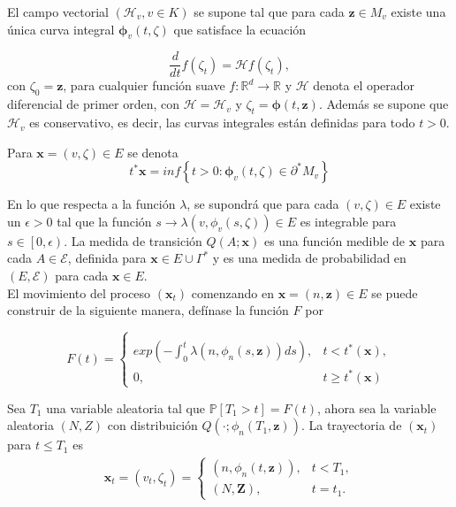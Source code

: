 \documentclass{article}
\newcommand{\rea}{\mathbb{R}}
\newcommand{\prob}{\mathbb{P}}
\numberwithin{equation}{section}
\begin{document}
El campo vectorial $\left(\mathcal{H}_{v},v\in K\right)$ se supone tal que para cada $\mathbf{z}\in M_{v}$ existe una \'unica curva integral $\mathbf{\phi}_{v}\left(t,\zeta\right)$ que satisface la ecuaci\'on

\begin{equation}
\frac{d}{dt}f\left(\zeta_{t}\right)=\mathcal{H}f\left(\zeta_{t}\right),
\end{equation}
con $\zeta_{0}=\mathbf{z}$, para cualquier funci\'on suave $f:\rea^{d}\rightarrow\rea$ y $\mathcal{H}$ denota el operador diferencial de primer orden, con $\mathcal{H}=\mathcal{H}_{v}$ y $\zeta_{t}=\mathbf{\phi}\left(t,\mathbf{z}\right)$. Adem\'as se supone que $\mathcal{H}_{v}$ es conservativo, es decir, las curvas integrales est\'an definidas para todo $t>0$.

Para $\mathbf{x}=\left(v,\zeta\right)\in E$ se denota \[t^{*}\mathbf{x}=inf\left\{t>0:\mathbf{\phi}_{v}\left(t,\zeta\right)\in\partial^{*}M_{v}\right\}\]

En lo que respecta a la funci\'on $\lambda$, se supondr\'a que para cada $\left(v,\zeta\right)\in E$ existe un $\epsilon>0$ tal que la funci\'on $s\rightarrow\lambda\left(v,\phi_{v}\left(s,\zeta\right)\right)\in E$ es integrable para $s\in\left[0,\epsilon\right)$. La medida de transici\'on $Q\left(A;\mathbf{x}\right)$ es una funci\'on medible de $\mathbf{x}$ para cada $A\in\mathcal{E}$, definida para $\mathbf{x}\in E\cup\Gamma^{*}$ y es una medida de probabilidad en $\left(E,\mathcal{E}\right)$ para cada $\mathbf{x}\in E$.\\

El movimiento del proceso $\left(\mathbf{x}_{t}\right)$ comenzando en $\mathbf{x}=\left(n,\mathbf{z}\right)\in E$ se puede construir de la siguiente manera, def\'inase la funci\'on $F$ por

\begin{equation}
F\left(t\right)=\left\{\begin{array}{ll}\\
exp\left(-\int_{0}^{t}\lambda\left(n,\phi_{n}\left(s,\mathbf{z}\right)\right)ds\right), & t<t^{*}\left(\mathbf{x}\right),\\
0, & t\geq t^{*}\left(\mathbf{x}\right)
\end{array}\right.
\end{equation}

Sea $T_{1}$ una variable aleatoria tal que $\prob\left[T_{1}>t\right]=F\left(t\right)$, ahora sea la variable aleatoria $\left(N,Z\right)$ con distribuici\'on $Q\left(\cdot;\phi_{n}\left(T_{1},\mathbf{z}\right)\right)$. La trayectoria de $\left(\mathbf{x}_{t}\right)$ para $t\leq T_{1}$ es
\begin{eqnarray*}
\mathbf{x}_{t}=\left(v_{t},\zeta_{t}\right)=\left\{\begin{array}{ll}
\left(n,\phi_{n}\left(t,\mathbf{z}\right)\right), & t<T_{1},\\
\left(N,\mathbf{Z}\right), & t=t_{1}.
\end{array}\right.
\end{eqnarray*}
\end{document}
